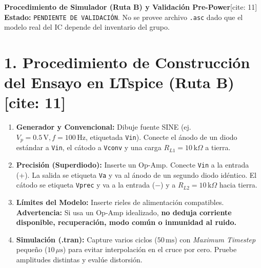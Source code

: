 \documentclass[10pt, a4paper]{article}
\begin{document}
\begin{center}
    {\Large\textbf{\textcolor{ucbblue}{Procedimiento de Simulador (Ruta B) y Validación Pre-Power}}}[cite: 11]\\[0.1cm]
    {\footnotesize\textbf{Estado:} \texttt{PENDIENTE DE VALIDACIÓN}. No se provee archivo \texttt{.asc} dado que el modelo real del IC depende del inventario del grupo.}
\end{center}

\section*{1. Procedimiento de Construcción del Ensayo en LTspice (Ruta B)[cite: 11]}
\begin{enumerate}
    \setlength{\itemsep}{1pt}
    \item \textbf{Generador y Convencional:} Dibuje fuente SINE (ej. $V_p = 0.5\,\text{V}, f = 100\,\text{Hz}$, etiquetada \texttt{Vin}). Conecte el ánodo de un diodo estándar a \texttt{Vin}, el cátodo a \texttt{Vconv} y una carga $R_{L1} = 10\,\text{k}\Omega$ a tierra.
    \item \textbf{Precisión (Superdiodo):} Inserte un Op-Amp. Conecte \texttt{Vin} a la entrada (+). La salida se etiqueta \texttt{Va} y va al ánodo de un segundo diodo idéntico. El cátodo se etiqueta \texttt{Vprec} y va a la entrada ($-$) y a $R_{L2} = 10\,\text{k}\Omega$ hacia tierra.
    \item \textbf{Límites del Modelo:} Inserte rieles de alimentación compatibles. \textbf{Advertencia:} Si usa un Op-Amp idealizado, \textbf{no deduja corriente disponible, recuperación, modo común o inmunidad al ruido.}
    \item \textbf{Simulación (.tran):} Capture varios ciclos ($50\,\text{ms}$) con \textit{Maximum Timestep} pequeño ($10\,\mu\text{s}$) para evitar interpolación en el cruce por cero. Pruebe amplitudes distintas y evalúe distorsión.
\end{enumerate}
\end{document}
